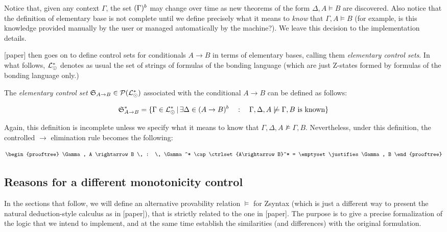 Notice that, given any context $\Gamma$, the set $(\Gamma)^{b}$ may change
over time as new theorems of the form $\Delta, A \models B$ are discovered.
Also notice that the definition of elementary base is not complete until we
define precisely what it means to \emph{know} that $\Gamma, A \models B$ (for
example, is this knowledge provided manually by the user or managed
automatically by the machine?). We leave this decision to the implementation
details.

[paper] then goes on to define control sets for conditionals $A \rightarrow B$
in terms of elementary bases, calling them \emph{elementary control sets}.  In
what follows, $\mathcal{L}_{\odot}^*$ denotes as usual the set of strings of formulas
of the bonding language (which are just Z-states formed by formulas of the
bonding language only.)

\begin{definition}
  The \emph{elementary control set}
  $\mathfrak{S}_{A \rightarrow B} \in \mathcal{P}(\mathcal{L}_{\odot}^*)$ associated with
  the conditional $A \rightarrow B$ can be defined as follows:

  \[
    \mathfrak{S}_{A \rightarrow B}^* = \{
    \Gamma \in \mathcal{L}_{\odot}^* \, | \, \exists \Delta \in (A \rightarrow
    B)^{b}
    \quad : \quad \Gamma, \Delta, A \not \models \Gamma, B \text{ is known}
    \}
  \]
\end{definition}

Again, this definition is incomplete unless we specify what it means to know
that $\Gamma, \Delta, A \not \models \Gamma, B$. Nevertheless, under this
definition, the controlled $\rightarrow$ elimination rule becomes the following:

\[
  \begin{prooftree}
    \Gamma, A \rightarrow B \, : \, \Gamma^* \cap \ctrlset{A\rightarrow B}^* =
    \emptyset
    \justifies
    \Gamma, B
  \end{prooftree}
\]

\subsection{Reasons for a different monotonicity control}

In the sections that follow, we will define an alternative provability relation
$\models$ for Zsyntax (which is just a different way to present the natural
deduction-style calculus as in [paper]), that is strictly related to the
one in [paper]. The purpose is to give a precise formalization of the
logic that we intend to implement, and at the same time establish the
similarities (and differences) with the original formulation.

